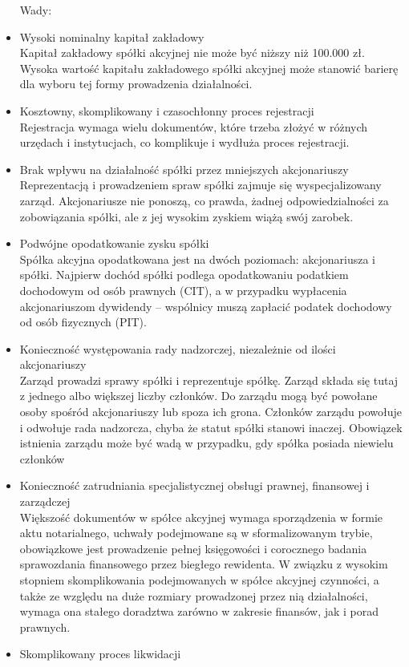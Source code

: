 \documentclass[a4paper, 11pt]{article}
\begin{document}
\begin{itemize}
Wady:\\
\item Wysoki nominalny kapitał zakładowy\\

Kapitał zakładowy spółki akcyjnej nie może być niższy niż 100.000 zł. Wysoka wartość kapitału zakładowego spółki akcyjnej może stanowić barierę dla wyboru tej formy prowadzenia działalności.
\item Kosztowny, skomplikowany i czasochłonny proces rejestracji\\

Rejestracja wymaga wielu dokumentów, które trzeba złożyć w różnych urzędach i instytucjach, co komplikuje i wydłuża proces rejestracji.
\item Brak wpływu na działalność spółki przez mniejszych akcjonariuszy\\

Reprezentacją i prowadzeniem spraw spółki zajmuje się wyspecjalizowany zarząd. Akcjonariusze nie ponoszą, co prawda, żadnej odpowiedzialności za zobowiązania spółki, ale z jej wysokim zyskiem wiążą swój zarobek. 
\item Podwójne opodatkowanie zysku spółki\\

Spółka akcyjna opodatkowana jest na dwóch poziomach: akcjonariusza i spółki. Najpierw dochód spółki podlega opodatkowaniu podatkiem dochodowym od osób prawnych (CIT), a w przypadku wypłacenia akcjonariuszom dywidendy – wspólnicy muszą zapłacić podatek dochodowy od osób fizycznych (PIT).
\item Konieczność występowania rady nadzorczej, niezależnie od ilości akcjonariuszy\\

Zarząd prowadzi sprawy spółki i reprezentuje spółkę. Zarząd składa się tutaj z jednego albo większej liczby członków. Do zarządu mogą być powołane osoby spośród akcjonariuszy lub spoza ich grona. Członków zarządu powołuje i odwołuje rada nadzorcza, chyba że statut spółki stanowi inaczej. Obowiązek istnienia zarządu może być wadą w przypadku, gdy spółka posiada niewielu członków 
\item Konieczność zatrudniania specjalistycznej obsługi prawnej, finansowej i zarządczej\\

Większość dokumentów w spółce akcyjnej wymaga sporządzenia w formie aktu notarialnego, uchwały podejmowane są w sformalizowanym trybie, obowiązkowe jest prowadzenie pełnej księgowości i corocznego badania sprawozdania finansowego przez biegłego rewidenta. W związku z wysokim stopniem skomplikowania podejmowanych w spółce akcyjnej czynności, a także ze względu na duże rozmiary prowadzonej przez nią działalności, wymaga ona stałego doradztwa zarówno w zakresie finansów, jak i porad prawnych.
\item Skomplikowany proces likwidacji\\


\end{itemize}
\end{document}
